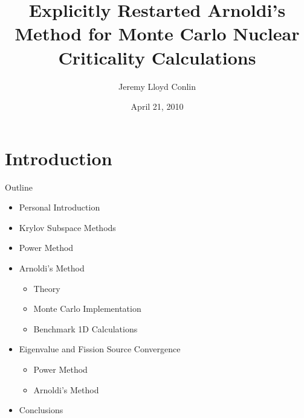 \documentclass[xcolor={usenames, dvipsnames},]{beamer}
\author[JLC]{Jeremy Lloyd Conlin}
\title[ERAM]{Explicitly Restarted Arnoldi's Method for Monte Carlo Nuclear Criticality Calculations}
\date[LANL]{April 21, 2010}
\begin{document}
\begin{frame}
    \titlepage
\end{frame}

\section{Introduction}
\begin{frame}{Outline}
    \begin{itemize}
        \item Personal Introduction
            \vspace{1em}
        \item Krylov Subspace Methods
        \item Power Method
        \item Arnoldi's Method
        \begin{itemize}
            \item Theory
            \item Monte Carlo Implementation
            \item Benchmark 1D Calculations
        \end{itemize}
        \item Eigenvalue and Fission Source Convergence
            \begin{itemize}
                \item Power Method
                \item Arnoldi's Method
            \end{itemize}
        \item Conclusions
    \end{itemize}
\end{frame}
\end{document}
